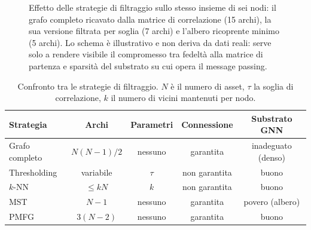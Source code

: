 \begin{figure}[H]
\centering
{}
\caption[Strategie di filtraggio del grafo di correlazione]{Effetto delle strategie di filtraggio sullo stesso insieme di sei nodi: il grafo completo ricavato dalla matrice di correlazione (15 archi), la sua versione filtrata per soglia (7 archi) e l'albero ricoprente minimo (5 archi). Lo schema è illustrativo e non deriva da dati reali: serve solo a rendere visibile il compromesso tra fedeltà alla matrice di partenza e sparsità del substrato su cui opera il message passing.}
\label{fig:graph-filtering}
\end{figure}

\begin{table}[H]
\centering
\caption[Confronto tra le strategie di costruzione del grafo]{Confronto tra le strategie di filtraggio. $N$ è il numero di asset, $\tau$ la soglia di correlazione, $k$ il numero di vicini mantenuti per nodo.}
\label{tab:graph-construction}
\begin{tabular}{@{}lcccc@{}}
\toprule
\textbf{Strategia} & \textbf{Archi} & \textbf{Parametri} & \textbf{Connessione} & \textbf{Substrato GNN} \\
\midrule
Grafo completo & $N(N-1)/2$ & nessuno & garantita   & inadeguato (denso) \\
Thresholding   & variabile   & $\tau$   & non garantita & buono \\
$k$-NN         & $\leq kN$   & $k$      & non garantita & buono \\
MST            & $N-1$       & nessuno  & garantita   & povero (albero) \\
PMFG           & $3(N-2)$    & nessuno  & garantita   & buono \\
\bottomrule
\end{tabular}
\end{table}

